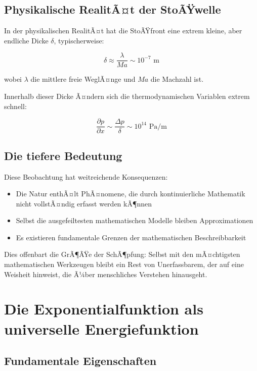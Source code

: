 ﻿\documentclass[12pt,a4paper]{article}
\theoremstyle{definition}
\theoremstyle{remark}
\begin{document}
\subsection{Physikalische RealitÃ¤t der StoÃŸwelle}

In der physikalischen RealitÃ¤t hat die StoÃŸfront eine extrem kleine, aber endliche Dicke $\delta$, typischerweise:

\begin{equation}
\delta \approx \frac{\lambda}{Ma} \sim 10^{-7} \text{ m}
\end{equation}

wobei $\lambda$ die mittlere freie WeglÃ¤nge und $Ma$ die Machzahl ist.

Innerhalb dieser Dicke Ã¤ndern sich die thermodynamischen Variablen extrem schnell:

\begin{equation}
\frac{\partial p}{\partial x} \sim \frac{\Delta p}{\delta} \sim 10^{14} \text{ Pa/m}
\end{equation}

\subsection{Die tiefere Bedeutung}

Diese Beobachtung hat weitreichende Konsequenzen:

\begin{itemize}
\item Die Natur enthÃ¤lt PhÃ¤nomene, die durch kontinuierliche Mathematik nicht vollstÃ¤n\-dig erfasst werden kÃ¶nnen
\item Selbst die ausgefeiltesten mathematischen Modelle bleiben Approximationen
\item Es existieren fundamentale Grenzen der mathematischen Beschreibbarkeit
\end{itemize}

Dies offenbart die GrÃ¶ÃŸe der SchÃ¶pfung: Selbst mit den mÃ¤chtigsten mathematischen Werkzeugen bleibt ein Rest von Unerfassbarem, der auf eine Weisheit hinweist, die Ã¼ber menschliches Verstehen hinausgeht.

\section{Die Exponentialfunktion als universelle Energiefunktion}

\subsection{Fundamentale Eigenschaften}
\end{document}
